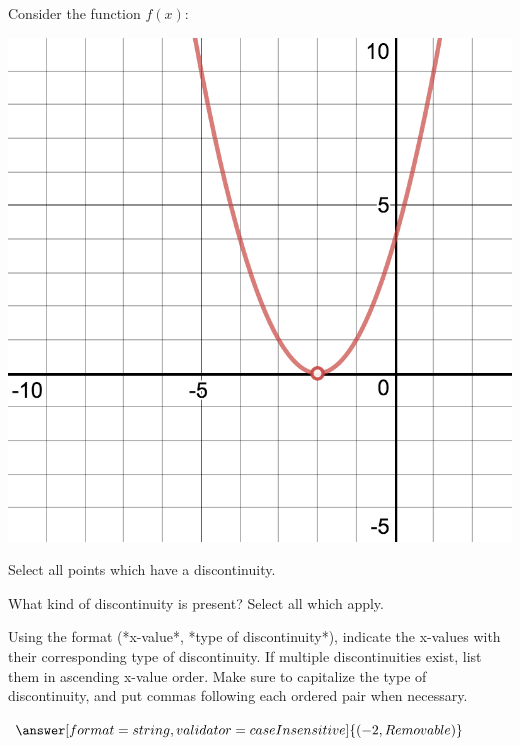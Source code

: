 \documentclass{ximera}
\begin{document}
\begin{question}
Consider the function $f(x)$:
\begin{image}
\includegraphics{continuity2}
\end{image}
Select all points which have a discontinuity.

\begin{selectAll}
\end{selectAll}

What kind of discontinuity is present? Select all which apply.

\begin{selectAll}
\end{selectAll}

Using the format (*x-value*, *type of discontinuity*), indicate the x-values with their corresponding type of discontinuity. If multiple discontinuities exist, list them in ascending x-value order. Make sure to capitalize the type of discontinuity, and put commas following each ordered pair when necessary.

$\answer[format=string,validator=caseInsensitive]{(-2,Removable)}$
\end{question}
\end{document}
